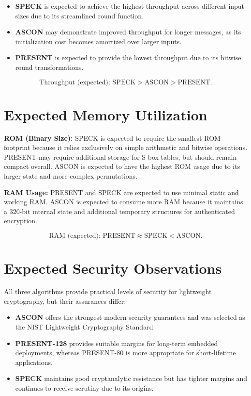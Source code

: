 \documentclass[12pt]{report}
\begin{document}
\begin{itemize}
    \item \textbf{SPECK} is expected to achieve the highest throughput across different input sizes due to its streamlined round function.
    \item \textbf{ASCON} may demonstrate improved throughput for longer messages, as its initialization cost becomes amortized over larger inputs.
    \item \textbf{PRESENT} is expected to provide the lowest throughput due to its bitwise round transformations.
\end{itemize}

\[
    \text{Throughput (expected): SPECK} > \text{ASCON} > \text{PRESENT}.
\]

\section{Expected Memory Utilization}

\textbf{ROM (Binary Size):}
SPECK is expected to require the smallest ROM footprint because it relies exclusively on simple arithmetic and bitwise operations. PRESENT may require additional storage for S-box tables, but should remain compact overall. ASCON is expected to have the highest ROM usage due to its larger state and more complex permutations.

\textbf{RAM Usage:}
PRESENT and SPECK are expected to use minimal static and working RAM. ASCON is expected to consume more RAM because it maintains a 320-bit internal state and additional temporary structures for authenticated encryption.

\[
    \text{RAM (expected): PRESENT} \approx \text{SPECK} < \text{ASCON}.
\]

\section{Expected Security Observations}

All three algorithms provide practical levels of security for lightweight cryptography, but their assurances differ:

\begin{itemize}
    \item \textbf{ASCON} offers the strongest modern security guarantees and was selected as the NIST Lightweight Cryptography Standard.
    \item \textbf{PRESENT-128} provides suitable margins for long-term embedded deployments, whereas PRESENT-80 is more appropriate for short-lifetime applications.
    \item \textbf{SPECK} maintains good cryptanalytic resistance but has tighter margins and continues to receive scrutiny due to its origins.
\end{itemize}
\end{document}
